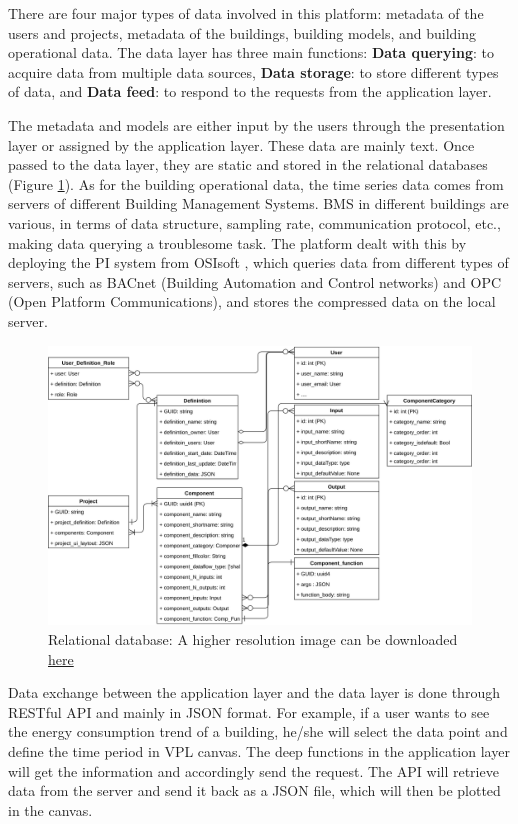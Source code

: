 \documentclass{scsSimAUDPaperFormat}
\begin{document}
There are four major types of data involved in this platform: metadata of the users and projects, metadata of the buildings, building models, and building operational data. The data layer has three main functions: \textbf{Data querying}: to acquire data from multiple data sources, \textbf{Data storage}: to store different types of data, and \textbf{Data feed}: to respond to the requests from the application layer.\par

The metadata and models are either input by the users through the presentation layer or assigned by the application layer. These data are mainly text. Once passed to the data layer, they are static and stored in the relational databases (Figure \ref{fig:relationDatabase}). As for the building operational data, the time series data comes from servers of different Building Management Systems. BMS in different buildings are various, in terms of data structure, sampling rate, communication protocol, etc., making data querying a troublesome task. The platform dealt with this by deploying the PI system from OSIsoft \cite{PiSystem}, which queries data from different types of servers, such as BACnet (Building Automation and Control networks) and OPC (Open Platform Communications), and stores the compressed data on the local server.\par
\begin{figure}
\includegraphics[width=\linewidth]{imgs/uml_relationship.jpeg}
\caption{Relational database: A higher resolution image can be downloaded  \href{https://user-images.githubusercontent.com/6969514/72235771-e9e89f80-360e-11ea-9cf7-91c0f521576c.jpeg}{here}
}
\label{fig:relationDatabase}
\end{figure}
Data exchange between the application layer and the data layer is done through RESTful API and mainly in JSON format. For example, if a user wants to see the energy consumption trend of a building, he/she will select the data point and define the time period in VPL canvas. The deep functions in the application layer will get the information and accordingly send the request. The API will retrieve data from the server and send it back as a JSON file, which will then be plotted in the canvas.
\end{document}
